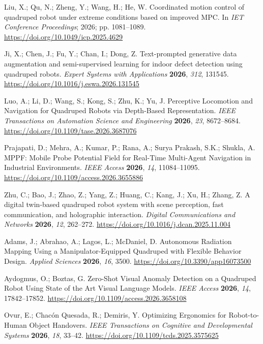 Liu, X.; Qu, N.; Zheng, Y.; Wang, H.; He, W. Coordinated motion control of quadruped robot under extreme conditions based on improved MPC. In \emph{IET Conference Proceedings}; 2026; pp. 1081--1089. \url{https://doi.org/10.1049/icp.2025.4629}

Ji, X.; Chen, J.; Fu, Y.; Chan, I.; Dong, Z. Text-prompted generative data augmentation and semi-supervised learning for indoor defect detection using quadruped robots. \emph{Expert Systems with Applications} \textbf{2026}, \emph{312}, 131545. \url{https://doi.org/10.1016/j.eswa.2026.131545}

Luo, A.; Li, D.; Wang, S.; Kong, S.; Zhu, K.; Yu, J. Perceptive Locomotion and Navigation for Quadruped Robots via Depth-Based Representation. \emph{IEEE Transactions on Automation Science and Engineering} \textbf{2026}, \emph{23}, 8672--8684. \url{https://doi.org/10.1109/tase.2026.3687076}

Prajapati, D.; Mehra, A.; Kumar, P.; Rana, A.; Surya Prakash, S.K.; Shukla, A. MPPF: Mobile Probe Potential Field for Real-Time Multi-Agent Navigation in Industrial Environments. \emph{IEEE Access} \textbf{2026}, \emph{14}, 11084--11095. \url{https://doi.org/10.1109/access.2026.3655886}

Zhu, C.; Bao, J.; Zhao, Z.; Yang, Z.; Huang, C.; Kang, J.; Xu, H.; Zhang, Z. A digital twin-based quadruped robot system with scene perception, fast communication, and holographic interaction. \emph{Digital Communications and Networks} \textbf{2026}, \emph{12}, 262--272. \url{https://doi.org/10.1016/j.dcan.2025.11.004}

Adams, J.; Abrahao, A.; Lagos, L.; McDaniel, D. Autonomous Radiation Mapping Using a Manipulator-Equipped Quadruped with Flexible Behavior Design. \emph{Applied Sciences} \textbf{2026}, \emph{16}, 3500. \url{https://doi.org/10.3390/app16073500}

Aydogmus, O.; Boztas, G. Zero-Shot Visual Anomaly Detection on a Quadruped Robot Using State of the Art Visual Language Models. \emph{IEEE Access} \textbf{2026}, \emph{14}, 17842--17852. \url{https://doi.org/10.1109/access.2026.3658108}

Ovur, E.; Chacón Quesada, R.; Demiris, Y. Optimizing Ergonomics for Robot-to-Human Object Handovers. \emph{IEEE Transactions on Cognitive and Developmental Systems} \textbf{2026}, \emph{18}, 33--42. \url{https://doi.org/10.1109/tcds.2025.3575625}

